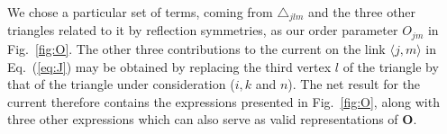 \documentclass[aps,prb,preprint,onecolumn,citeautoscript,superscriptaddress,footinbib,
eqsecnum]{revtex4-1}
\begin{document}
We chose a particular set of terms, coming from $\triangle_{jlm}$ and the three other triangles related to it by reflection symmetries, as our order parameter $O_{jm}$ in Fig.~\ref{fig:O}. The other three contributions to the current on the link $\langle j,m \rangle$ in Eq.~(\ref{eq:J}) may be obtained by replacing the third vertex $l$ of the triangle by that of the triangle under consideration ($i,k$ and $n$). The net result for the current therefore contains the expressions presented in Fig.~\ref{fig:O}, along with three other expressions which can also serve as valid representations of ${\bm O}$.


\end{document}
